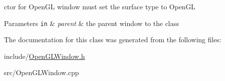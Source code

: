 ctor for Open\-G\-L window must set the surface type to Open\-G\-L 


\begin{DoxyParams}[1]{Parameters}
\mbox{\tt in}  & {\em parent} & the parent window to the class \\
\hline
\end{DoxyParams}


The documentation for this class was generated from the following files\-:\begin{DoxyCompactItemize}
\item 
include/\hyperlink{OpenGLWindow_8h}{Open\-G\-L\-Window.\-h}\item 
src/Open\-G\-L\-Window.\-cpp\end{DoxyCompactItemize}
